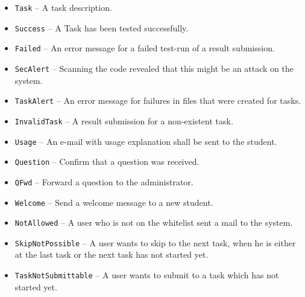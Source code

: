 \begin{description}
\begin{itemize}
            \begin{itemize}
            \item {\tt Task} -- A task description.
            \item {\tt Success} -- A Task has been tested successfully.
            \item {\tt Failed} -- An error message for a failed test-run of a result submission.
            \item {\tt SecAlert} -- Scanning the code revealed that this might be an attack on the system.
            \item {\tt TaskAlert} -- An error message for failures in files that were created for tasks.
            \item {\tt InvalidTask} -- A result submission for a non-existent task.
            \item {\tt Usage} -- An e-mail with usage explanation shall be sent to the student. 
            \item {\tt Question} -- Confirm that a question was received.
            \item {\tt QFwd} -- Forward a question to the administrator.
            \item {\tt Welcome} -- Send a welcome message to a new student.
			\item {\tt NotAllowed} -- A user who is not on the whitelist sent a mail to the system.
			\item {\tt SkipNotPossible} -- A user wants to skip to the next
				task, when he is either at the last task or the next task has not started yet.
			\item {\tt TaskNotSubmittable} -- A user wants to submit to a task
											 which has not started yet.
            \end{itemize}


\end{itemize}
\end{description}
